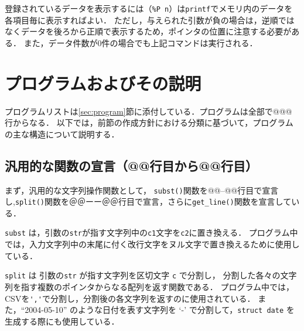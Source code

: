 \documentclass[a4j,11pt]{jarticle}
\begin{document}
登録されているデータを表示するには（\verb|%P n|）は\verb|printf|でメモリ内のデータを各項目毎に表示すればよい．
ただし，与えられた引数が負の場合は，逆順ではなくデータを後ろから正順で表示するため，ポインタの位置に注意する必要がある．
また，データ件数が0件の場合でも上記コマンドは実行される．

\section{プログラムおよびその説明}\label{sec:explain}



プログラムリストは\ref{sec:program}節に添付している．プログラムは全部で@@@行からなる．
以下では，前節の作成方針における分類に基づいて，プログラムの主な構造について説明する．

\subsection{汎用的な関数の宣言（@@行目から@@行目）}

まず，汎用的な文字列操作関数として，
\verb|subst()|関数を@@--@@行目で宣言し,\verb|split()|関数を＠＠ーー＠＠行目で宣言，さらに\verb|get_line()|関数を宣言している．

\verb|subst| は，引数の\verb|str|が指す文字列中の\verb|c1|文字を\verb|c2|に置き換える．
プログラム中では，入力文字列中の末尾に付く改行文字をヌル文字で置き換えるために使用している．

\verb|split| は 引数の\verb|str| が指す文字列を区切文字 \verb|c| で分割し，
分割した各々の文字列を指す複数のポインタからなる配列を返す関数である．
プログラム中では，CSVを\verb|','|で分割し，分割後の各文字列を返すのに使用されている．
また，``2004-05-10'' のような日付を表す文字列を `-' で分割して，\verb|struct date| を生成する際にも使用している．
\end{document}
